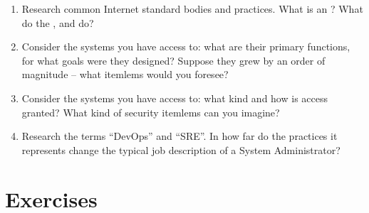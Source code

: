 \begin{enumerate}
\item Research common Internet standard bodies and
practices.  What is an ?  What do the
,  and
 do?

\item Consider the systems you have access to: what
are their primary functions, for what goals were they
designed?  Suppose they grew by an order of magnitude
-- what itemlems would you foresee?

\item Consider the systems you have access to: what
kind and how is access granted?  What kind of security
itemlems can you imagine?

\item Research the terms ``DevOps'' and
``SRE''.  In how far do the practices it
represents change the typical job description of a
System Administrator?

\end{enumerate}

\section*{Exercises}

